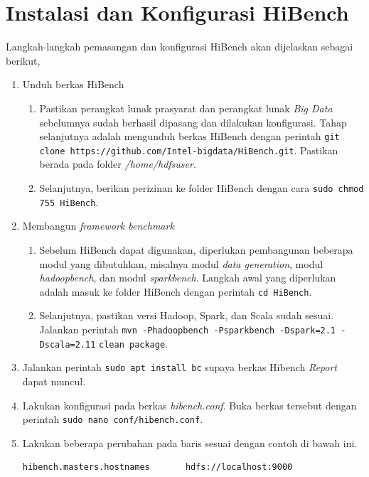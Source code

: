 

\chapter{Instalasi dan Konfigurasi HiBench}
\label{appendix:E}

Langkah-langkah pemasangan dan konfigurasi HiBench akan dijelaskan sebagai berikut,

\begin{enumerate}
  \item Unduh berkas HiBench
  \begin{enumerate}
    \item Pastikan perangkat lunak prasyarat dan perangkat lunak \textit{Big Data} sebelumnya sudah berhasil dipasang dan dilakukan konfigurasi. Tahap selanjutnya adalah mengunduh berkas HiBench dengan perintah \verb|git clone https://github.com/Intel-bigdata/HiBench.git|. Pastikan berada pada folder \textit{/home/hdfsuser}.
    \item Selanjutnya, berikan perizinan ke folder HiBench dengan cara \verb|sudo chmod 755 HiBench|.
  \end{enumerate}
  \item Membangun \textit{framework benchmark}
  \begin{enumerate}
    \item Sebelum HiBench dapat digunakan, diperlukan pembangunan beberapa modul yang dibutuhkan, misalnya modul \textit{data generation}, modul \textit{hadoopbench}, dan modul \textit{sparkbench}. Langkah awal yang diperlukan adalah masuk ke folder HiBench dengan perintah \verb|cd HiBench|.
    \item Selanjutnya, pastikan versi Hadoop, Spark, dan Scala sudah sesuai. Jalankan perintah \verb|mvn -Phadoopbench -Psparkbench -Dspark=2.1 -Dscala=2.11| \newline \verb|clean package|.
  \end{enumerate}
  \item Jalankan perintah \verb |sudo apt install bc| supaya berkas Hibench \textit{Report} dapat muncul. 
  \item Lakukan konfigurasi pada berkas \textit{hibench.conf}. Buka berkas tersebut dengan perintah \verb|sudo nano conf/hibench.conf|.
  \item Lakukan beberapa perubahan pada baris sesuai dengan contoh di bawah ini.
    \begin{lstlisting}[language=bash]
hibench.masters.hostnames       hdfs://localhost:9000

\end{lstlisting}
\end{enumerate}

